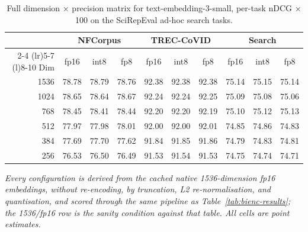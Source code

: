 \begin{table}[H]
\caption{Full dimension $\times$ precision matrix for text-embedding-3-small, per-task nDCG $\times$100 on the SciRepEval ad-hoc search tasks.}
\label{tab:quant-te3s-full}
\centering
\footnotesize
\begin{tabular}{@{}r ccc ccc ccc@{}}
\toprule
& \multicolumn{3}{c}{NFCorpus} & \multicolumn{3}{c}{TREC-CoVID} & \multicolumn{3}{c}{Search} \\
\cmidrule(lr){2-4} \cmidrule(lr){5-7} \cmidrule(l){8-10}
Dim & fp16 & int8 & fp8 & fp16 & int8 & fp8 & fp16 & int8 & fp8 \\
\midrule
1536 & 78.78 & 78.79 & 78.76 & 92.38 & 92.38 & 92.38 & 75.14 & 75.15 & 75.14 \\
1024 & 78.65 & 78.64 & 78.67 & 92.24 & 92.24 & 92.25 & 75.09 & 75.08 & 75.06 \\
768 & 78.45 & 78.41 & 78.44 & 92.20 & 92.20 & 92.19 & 75.10 & 75.12 & 75.13 \\
512 & 77.97 & 77.98 & 78.01 & 92.00 & 92.00 & 92.01 & 74.85 & 74.86 & 74.83 \\
384 & 77.69 & 77.70 & 77.62 & 91.84 & 91.85 & 91.86 & 74.79 & 74.83 & 74.81 \\
256 & 76.53 & 76.50 & 76.49 & 91.53 & 91.54 & 91.53 & 74.75 & 74.74 & 74.71 \\
\bottomrule
\end{tabular}

\vspace{3pt}
\begin{minipage}{\textwidth}
\footnotesize\itshape
Every configuration is derived from the cached native 1536-dimension fp16 embeddings, without re-encoding, by truncation, L2 re-normalisation, and quantisation, and scored through the same pipeline as Table~\ref{tab:bienc-results}; the 1536/fp16 row is the sanity condition against that table. All cells are point estimates.
\end{minipage}
\end{table}

